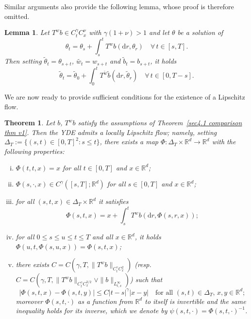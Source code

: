 \documentclass[10pt]{article}
\newcommand{\assign}{:=}
\newcommand{\mathd}{\mathrm{d}}
\newenvironment{enumerateroman}{\begin{enumerate}[i.] }{\end{enumerate}}
\newtheorem{lemma}{Lemma}
\newtheorem{theorem}{Theorem}
\begin{document}
Similar arguments also provide the following lemma, whose proof is therefore
omitted.

\begin{lemma}
  \label{sec4.3 lemma translated YDE}Let $T^w b \in C^{\gamma}_t C^{\nu}_x$
  with $\gamma (1 + \nu) > 1$ and let $\theta$ be a solution of
  \[ \theta_t = \theta_s + \int_s^t T^w b (\mathd r, \theta_r) \quad \forall
     \, t \in [s, T] . \]
  Then setting $\tilde{\theta}_t = \theta_{s + t}$, $\widetilde{w_t} = w_{s +
  t}$ and $\tilde{b}_t = b_{s + t}$, it holds
  \[ \tilde{\theta}_t = \tilde{\theta}_0 + \int_0^t T^{\tilde{w}} \tilde{b}
     (\mathd r, \tilde{\theta}_r) \quad \forall \, t \in [0, T - s] . \]
\end{lemma}

We are now ready to provide sufficient conditions for the existence of a
Lipschitz flow.

\begin{theorem}
  \label{sec4.3 theorem existence flow}Let $b$, $T^w b$ satisfy the
  assumptions of Theorem~\ref{sec4.1 comparison thm v1}. Then the YDE admits a
  locally Lipschitz flow; namely, setting $\Delta_T \assign \{ (s, t) \in [0,
  T]^2 : s \leqslant t \}$, there exists a map $\Phi : \Delta_T \times
  \mathbb{R}^d \rightarrow \mathbb{R}^d$ with the following properties:
  \begin{enumerateroman}
    \item $\Phi (t, t, x) = x$ for all $t \in [0, T]$ and $x \in
    \mathbb{R}^d$;
    
    \item $\Phi (s, \cdot, x) \in C^{\gamma} ([s, T] ; \mathbb{R}^d)$ for all
    $s \in [0, T]$ and $x \in \mathbb{R}^d$;
    
    \item for all $(s, t, x) \in \Delta_T \times \mathbb{R}^d$ it satisfies
    \[ \Phi (s, t, x) = x + \int_s^t T^w b (\mathd r, \Phi (s, r, x)) ; \]
    \item for all $0 \leqslant s \leqslant u \leqslant t \leqslant T$ and all
    $x \in \mathbb{R}^d$, it holds $\Phi (u, t, \Phi (s, u, x)) = \Phi (s, t,
    x)$;
    
    \item there exists $C = C (\gamma, T, \| T^w b \|_{C^{\gamma}_t
    C^2_x})$ (resp. $C = C (\gamma, T, \| T^w b \|_{C^{\gamma}_t C^{3 / 2}_x}
    \vee \| b \|_{L^{\infty}_{t, x}})$) such that
    \[ | \Phi (s, t, x) - \Phi (s, t, y) | \leqslant C | t - s |^{\gamma} | x
       - y | \quad \text{for all } (s, t) \in \Delta_T, \, x, y \in
       \mathbb{R}^d ; \]
    moreover $\Phi (s, t, \cdot)$ as a function from $\mathbb{R}^d$ to itself
    is invertible and the same inequality holds for its inverse, which we
    denote by $\psi (s, t, \cdot) = \Phi (s, t, \cdot)^{- 1}$.
  \end{enumerateroman}
\end{theorem}
\end{document}
